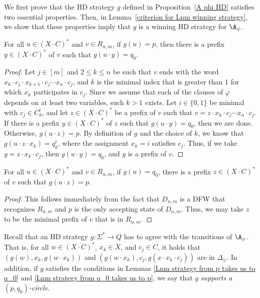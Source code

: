 \documentclass{lmcs}
\begin{document}
We first prove that the HD strategy $g$ defined in Proposition~\ref{A phi HD} satisfies two essential properties. Then, in Lemma~\ref{criterion for Lnm winning strategy}, we show that these properties imply that $g$ is a winning HD strategy for $\A_\varphi$.

\begin{lem}\label{Lnm strategy from p takes us to q_0}
	For all $u\in (X\cdot C)^*$ and $v\in R_{n,m}$, if $g(u)=p$, then there is a prefix $y\in (X\cdot C)^*$ of $v$ such that $g(u\cdot y)=q_0$.
\end{lem}

\begin{proof}
	Let $j\in [m]$ and $2\leq k\leq n$ be such that $v$ ends with the word $x_k\cdot c_j\cdot x_{k+1}\cdot c_j\cdots x_n\cdot c_j$, and $k$ is the minimal index that is greater than $1$ for which $x_k$ participates in $c_j$. 
	Since we assume that each of the clauses of $\varphi$ depends on at least two variables, such $k>1$ exists. 
	Let $i\in {\{0,1\}}$ be minimal with $c_j \in C_k^i$, and let $z\in (X\cdot C)^*$ be a prefix of $v$ such that $v=z\cdot x_k\cdot c_j\cdots x_n\cdot c_j$.
	If there is a prefix $y\in (X\cdot C)^*$ of $z$ such that $g(u\cdot y)=q_0$, then we are done. Otherwise, $g(u\cdot z)=p$. By definition of $g$ and the choice of $k$, we know that $g(u\cdot z\cdot x_k)=q^i_k$, where the assignment $x_k=i$ satisfies $c_j$. Thus, if we take $y=z\cdot x_k\cdot c_j$, then $g(u\cdot y)=q_0$, and $y$ is a prefix of $v$.
\end{proof}

\begin{lem}\label{Lnm strategy from q_0 takes us to p}
	For all $u\in (X\cdot C)^*$ and $v\in R_{n,m}$, if $g(u)=q_0$, there is a prefix $z\in (X\cdot C)^*$ of $v$ such that $g(u\cdot z)=p$.
\end{lem}

\begin{proof}
	This follows immediately from the fact that $D_{n,m}$ is a DFW that recognizes $R_{n,m}$ and $p$ is the only accepting state of $D_{n,m}$. Thus, we may take $z$ to be the minimal prefix of $v$ that is in $R_{n,m}$.
\end{proof}

Recall that an HD strategy $g:\Sigma^*\rightarrow Q$ has to agree with the transitions of $\A_\varphi$. That is, 
for all $w\in (X\cdot C)^*$, $x_k\in X$, and $c_j\in C$, it holds that $(g(w),x_k,g(w\cdot x_k))$ and $(g(w\cdot x_k),c_j,g(x\cdot x_k\cdot c_j))$ are in $\Delta_\varphi$. In addition, if $g$ satisfies the conditions in Lemmas \ref{Lnm strategy from p takes us to q_0} and \ref{Lnm strategy from q_0 takes us to p}, we say that $g$ {\em supports a $(p,q_0)$-circle}.  
\end{document}
